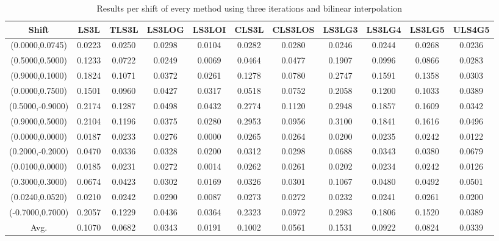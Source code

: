 \begin{table}[ht!]
\centering
\begin{tabular}{c|c|c|c|c|c|c|c|c|c|c}
Shift & \scriptsize{LS3L} & \scriptsize{TLS3L} & \scriptsize{LS3LOG} & \scriptsize{LS3LOI} & \scriptsize{CLS3L} & \scriptsize{CLS3LOS} & \scriptsize{LS3LG3} & \scriptsize{LS3LG4} & \scriptsize{LS3LG5} & \scriptsize{ULS4G5}\\ \hline 
(0.0000,0.0745) & 0.0223 & 0.0250 & 0.0298 & 0.0104 & 0.0282 & 0.0280 & 0.0246 & 0.0244 & 0.0268 & 0.0236 \\ \hline
(0.5000,0.5000) & 0.1233 & 0.0722 & 0.0249 & 0.0069 & 0.0464 & 0.0477 & 0.1907 & 0.0996 & 0.0866 & 0.0283 \\ \hline
(0.9000,0.1000) & 0.1824 & 0.1071 & 0.0372 & 0.0261 & 0.1278 & 0.0780 & 0.2747 & 0.1591 & 0.1358 & 0.0303 \\ \hline
(0.0000,0.7500) & 0.1501 & 0.0960 & 0.0427 & 0.0317 & 0.0518 & 0.0752 & 0.2058 & 0.1200 & 0.1033 & 0.0389 \\ \hline
(0.5000,-0.9000) & 0.2174 & 0.1287 & 0.0498 & 0.0432 & 0.2774 & 0.1120 & 0.2948 & 0.1857 & 0.1609 & 0.0342 \\ \hline
(0.9000,0.5000) & 0.2104 & 0.1196 & 0.0375 & 0.0280 & 0.2953 & 0.0956 & 0.3100 & 0.1841 & 0.1616 & 0.0496 \\ \hline
(0.0000,0.0000) & 0.0187 & 0.0233 & 0.0276 & 0.0000 & 0.0265 & 0.0264 & 0.0200 & 0.0235 & 0.0242 & 0.0122 \\ \hline
(0.2000,-0.2000) & 0.0470 & 0.0336 & 0.0328 & 0.0200 & 0.0312 & 0.0298 & 0.0688 & 0.0343 & 0.0380 & 0.0679 \\ \hline
(0.0100,0.0000) & 0.0185 & 0.0231 & 0.0272 & 0.0014 & 0.0262 & 0.0261 & 0.0202 & 0.0234 & 0.0242 & 0.0126 \\ \hline
(0.3000,0.3000) & 0.0674 & 0.0423 & 0.0302 & 0.0169 & 0.0326 & 0.0301 & 0.1067 & 0.0480 & 0.0492 & 0.0501 \\ \hline
(0.0240,0.0520) & 0.0210 & 0.0242 & 0.0290 & 0.0087 & 0.0273 & 0.0272 & 0.0232 & 0.0241 & 0.0261 & 0.0200 \\ \hline
(-0.7000,0.7000) & 0.2057 & 0.1229 & 0.0436 & 0.0364 & 0.2323 & 0.0972 & 0.2983 & 0.1806 & 0.1520 & 0.0389 \\ \hline
Avg.  & 0.1070 & 0.0682 & 0.0343 & 0.0191 & 0.1002 & 0.0561 & 0.1531 & 0.0922 & 0.0824 & 0.0339 \\ \hline
\end{tabular}
\caption{Results per shift of every method using three iterations and bilinear interpolation}
\label{tab:3itLperShift}
\end{table}


